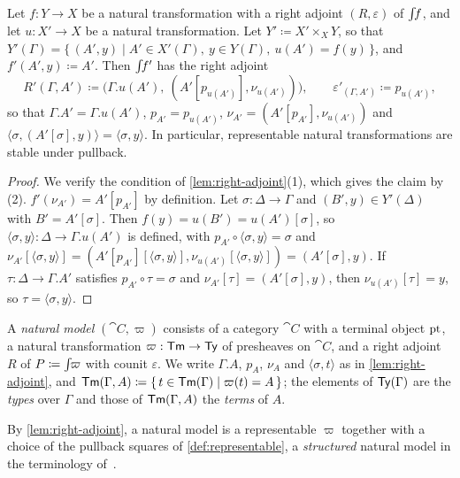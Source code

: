 \begin{lemma}\label{lem:pullback}
    Let $f : Y \to X$ be a natural transformation with a right adjoint $(R, \varepsilon)$ of $\int\!\!f$, and let $u : X' \to X$ be a natural transformation. Let $Y' \coloneqq X' \times_X Y$, so that $Y'(\Gamma) = \{\, (A', y) \mid A' \in X'(\Gamma),\ y \in Y(\Gamma),\ u(A') = f(y) \,\}$, and $f'(A', y) \coloneqq A'$. Then $\int\!\!f'$ has the right adjoint
    \[
        R'(\Gamma, A') \coloneqq \big( \Gamma.u(A'),\ (A'[p_{u(A')}], \nu_{u(A')}) \big), \qquad \varepsilon'_{(\Gamma, A')} \coloneqq p_{u(A')},
    \]
    so that $\Gamma.A' = \Gamma.u(A')$, $p_{A'} = p_{u(A')}$, $\nu_{A'} = (A'[p_{A'}], \nu_{u(A')})$ and $\langle \sigma, (A'[\sigma], y) \rangle = \langle \sigma, y \rangle$. In particular, representable natural transformations are stable under pullback.
\end{lemma}

\begin{proof}
    We verify the condition of \cref{lem:right-adjoint}(1), which gives the claim by (2). $f'(\nu_{A'}) = A'[p_{A'}]$ by definition. Let $\sigma : \Delta \to \Gamma$ and $(B', y) \in Y'(\Delta)$ with $B' = A'[\sigma]$. Then $f(y) = u(B') = u(A')[\sigma]$, so $\langle \sigma, y \rangle : \Delta \to \Gamma.u(A')$ is defined, with $p_{A'} \circ \langle \sigma, y \rangle = \sigma$ and $\nu_{A'}[\langle \sigma, y \rangle] = (A'[p_{A'}][\langle \sigma, y \rangle], \nu_{u(A')}[\langle \sigma, y \rangle]) = (A'[\sigma], y)$. If $\tau : \Delta \to \Gamma.A'$ satisfies $p_{A'} \circ \tau = \sigma$ and $\nu_{A'}[\tau] = (A'[\sigma], y)$, then $\nu_{u(A')}[\tau] = y$, so $\tau = \langle \sigma, y \rangle$.
\end{proof}

\begin{definition}\label{def:natural-model}
    A \emph{natural model} $(\cat{C}, \varpi)$ consists of a category $\cat{C}$ with a terminal object $\mathrm{pt}$, a natural transformation $\varpi : \mathsf{Tm} \to \mathsf{Ty}$ of presheaves on $\cat{C}$, and a right adjoint $R$ of $P \coloneqq \int\!\!\varpi$ with counit $\varepsilon$. We write $\Gamma.A$, $p_A$, $\nu_A$ and $\langle \sigma, t \rangle$ as in \cref{lem:right-adjoint}, and $\mathsf{Tm}(\Gamma, A) \coloneqq \{\, t \in \mathsf{Tm}(\Gamma) \mid \varpi(t) = A \,\}$; the elements of $\mathsf{Ty}(\Gamma)$ are the \emph{types} over $\Gamma$ and those of $\mathsf{Tm}(\Gamma, A)$ the \emph{terms} of $A$.
\end{definition}

By \cref{lem:right-adjoint}, a natural model is a representable $\varpi$ together with a choice of the pullback squares of \cref{def:representable}, a \emph{structured} natural model in the terminology of~\cite[Def.~42]{AhrensLumsdaineNorth2024}.

